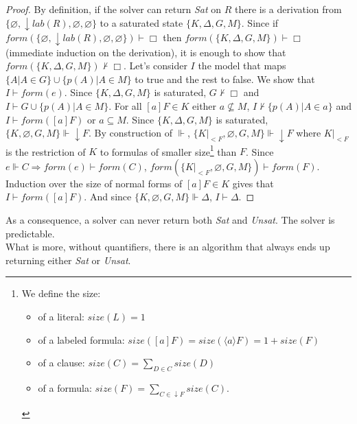 \documentclass[a4paper,11pt]{article}
\newcommand{\F}{\mathit{form}}
\newcommand{\T}{\mathit{lab}}
\newcommand{\Si}{\mathit{size}}
\begin{document}
\begin{proof}
By definition, if the solver can return \emph{Sat} on $R$ there is a derivation from
$\{\varnothing,\downarrow\T(R),\varnothing,\varnothing\}$ to a saturated state $\{K,\Delta,G,M\}$. Since
if $\F(\{\varnothing,\downarrow\T(R),\varnothing,\varnothing\})\vdash\Box$ then
$\F(\{K,\Delta,G,M\})\vdash\Box$ (immediate induction on the derivation), it is enough to show that
$\F(\{K,\Delta,G,M\})\nvdash\Box$.
Let's consider $I$ the model that maps $\{A|A\in G\}\cup\{p(A)|A\in M\}$ to true and the rest to false.
We show that $I\vdash\F(e)$. Since $\{K,\Delta,G,M\}$ is saturated, $G\nvdash\Box$ and
$I\vdash G\cup\{p(A)|A\in M\}$. For all $[a]F\in K$ either $a\nsubseteq M$, $I\nvdash\{p(A)|A\in a\}$
and $I\vdash\F([a]F)$ or $a\subseteq M$. Since $\{K,\Delta,G,M\}$ is saturated,
$\{K,\varnothing,G,M\}\Vdash\downarrow F$. By construction of $\Vdash$, $\{K|_{<F},\varnothing,G,M\}
\Vdash\downarrow F$ where
$K|_{<F}$ is the restriction of $K$ to formulas of smaller size\footnote{
We define the size:
\begin{itemize}
 \item of a literal: $\Si(L)=1$
 \item of a labeled formula: $\Si([a]F)=\Si(\langle a\rangle F)=1+\Si(F)$
 \item of a clause: $\Si(C)=\sum_{D\in C}\Si(D)$
 \item of a formula: $\Si(F)=\sum_{C\in\downarrow F}\Si(C)$.
\end{itemize}}
than $F$. Since $e\Vdash C\Rightarrow\F(e)\vdash\F(C)$,
$\F(\{K|_{<F},\varnothing,G,M\})\vdash\F(F)$. Induction over
the size of normal forms of $[a]F\in K$ gives that $I\vdash\F([a]F)$.
And since $\{K,\varnothing,G,M\}\Vdash\Delta$, $I\vdash\Delta$.
\end{proof}

As a consequence, a solver can never return both \emph{Sat} and \emph{Unsat}.
{\corollary The solver is predictable.}\\
What is more, without quantifiers, there is an algorithm that always ends up returning either \emph{Sat}
or \emph{Unsat}.
\end{document}
